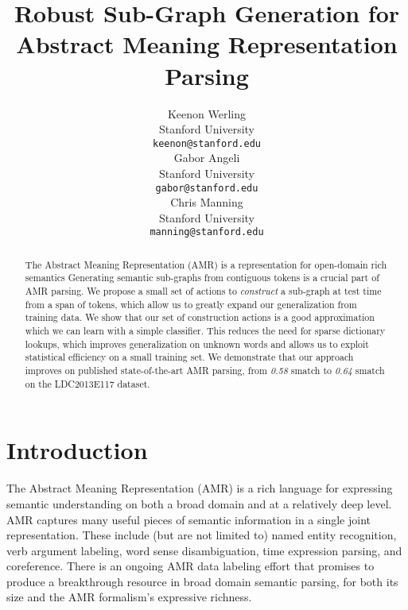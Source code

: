 \documentclass[11pt]{article}
\title{Robust Sub-Graph Generation for Abstract Meaning Representation Parsing}
\author{Keenon Werling \\
  Stanford University\\
  {\tt keenon@stanford.edu} \\\And
  Gabor Angeli \\
  Stanford University\\
  {\tt gabor@stanford.edu} \\\And
  Chris Manning \\
  Stanford University\\
  {\tt manning@stanford.edu} \\}
\date{}
\begin{document}
\maketitle
\begin{abstract}


The Abstract Meaning Representation (AMR) is a representation for open-domain rich semantics
Generating semantic sub-graphs from contiguous tokens is a crucial part of AMR parsing.
We propose a small set of actions to \textit{construct} a sub-graph at test time from a span of tokens, which allow us to greatly expand our generalization from training data.
We show that our set of construction actions is a good approximation which we can learn with a simple classifier.
This reduces the need for sparse dictionary lookups, which improves generalization on unknown words and allows us to exploit statistical efficiency on a small training set.
We demonstrate that our approach improves on published state-of-the-art AMR parsing, from \textit{0.58} smatch to \textit{0.64} smatch on the LDC2013E117 dataset.

\end{abstract}

\section{Introduction}


The Abstract Meaning Representation (AMR) \cite{Banarescu:13} is a rich language for expressing semantic understanding on both a broad domain and at a relatively deep level. AMR captures many useful pieces of semantic information in a single joint representation. These include (but are not limited to) named entity recognition, verb argument labeling, word sense disambiguation, time expression parsing, and coreference. There is an ongoing AMR data labeling effort that promises to produce a breakthrough resource in broad domain semantic parsing, for both its size and the AMR formalism's expressive richness.
\end{document}
